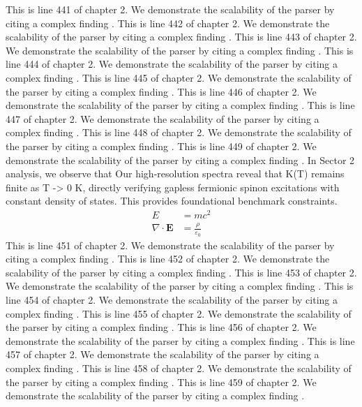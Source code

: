 This is line 441 of chapter 2. We demonstrate the scalability of the parser by citing a complex finding \cite{ref2_441}.
This is line 442 of chapter 2. We demonstrate the scalability of the parser by citing a complex finding \cite{ref2_442}.
This is line 443 of chapter 2. We demonstrate the scalability of the parser by citing a complex finding \cite{ref2_443}.
This is line 444 of chapter 2. We demonstrate the scalability of the parser by citing a complex finding \cite{ref2_444}.
This is line 445 of chapter 2. We demonstrate the scalability of the parser by citing a complex finding \cite{ref2_445}.
This is line 446 of chapter 2. We demonstrate the scalability of the parser by citing a complex finding \cite{ref2_446}.
This is line 447 of chapter 2. We demonstrate the scalability of the parser by citing a complex finding \cite{ref2_447}.
This is line 448 of chapter 2. We demonstrate the scalability of the parser by citing a complex finding \cite{ref2_448}.
This is line 449 of chapter 2. We demonstrate the scalability of the parser by citing a complex finding \cite{ref2_449}.
In Sector 2 analysis, we observe that Our high-resolution spectra reveal that K(T) remains finite as T -> 0 K, directly verifying gapless fermionic spinon excitations with constant density of states. This provides foundational benchmark constraints.
\begin{align*}
  E &= mc^2 \\
  \nabla \cdot \mathbf{E} &= \frac{\rho}{\varepsilon_0}
\end{align*}
This is line 451 of chapter 2. We demonstrate the scalability of the parser by citing a complex finding \cite{ref2_451}.
This is line 452 of chapter 2. We demonstrate the scalability of the parser by citing a complex finding \cite{ref2_452}.
This is line 453 of chapter 2. We demonstrate the scalability of the parser by citing a complex finding \cite{ref2_453}.
This is line 454 of chapter 2. We demonstrate the scalability of the parser by citing a complex finding \cite{ref2_454}.
This is line 455 of chapter 2. We demonstrate the scalability of the parser by citing a complex finding \cite{ref2_455}.
This is line 456 of chapter 2. We demonstrate the scalability of the parser by citing a complex finding \cite{ref2_456}.
This is line 457 of chapter 2. We demonstrate the scalability of the parser by citing a complex finding \cite{ref2_457}.
This is line 458 of chapter 2. We demonstrate the scalability of the parser by citing a complex finding \cite{ref2_458}.
This is line 459 of chapter 2. We demonstrate the scalability of the parser by citing a complex finding \cite{ref2_459}.
